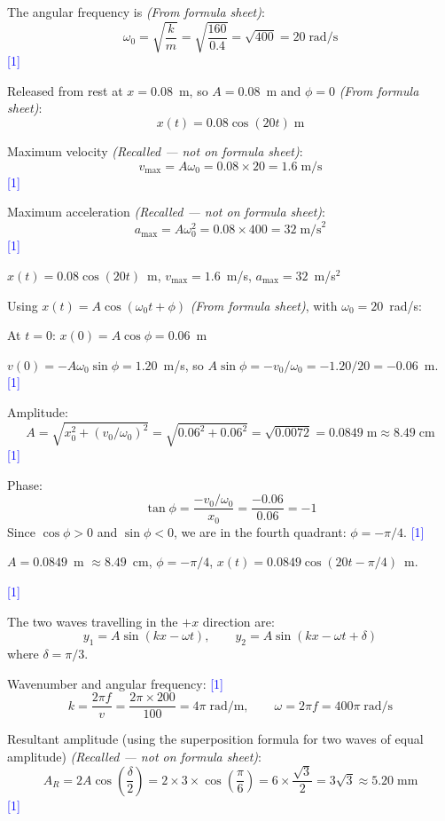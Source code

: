 \documentclass[12pt,a4paper]{article}
\newcommand{\markstep}[1]{\hfill\textcolor{blue}{[#1]}}
\newcommand{\finalanswer}[1]{%
  \begin{tcolorbox}[colback=green!5!white,colframe=green!50!black,boxrule=0.5pt]
  #1
  \end{tcolorbox}
}
\newcommand{\fromsheet}{\textit{(From formula sheet)}}
\newcommand{\recalled}{\textit{(Recalled --- not on formula sheet)}}
\begin{document}
\begin{parts}
\item The angular frequency is \fromsheet:
\[
\omega_0 = \sqrt{\frac{k}{m}} = \sqrt{\frac{160}{0.4}} = \sqrt{400} = 20\;\text{rad/s}
\]
\markstep{1}

Released from rest at $x = 0.08$~m, so $A = 0.08$~m and $\phi = 0$ \fromsheet:
\[
x(t) = 0.08\cos(20t)\;\text{m}
\]

Maximum velocity \recalled:
\[
v_\mathrm{max} = A\omega_0 = 0.08 \times 20 = 1.6\;\text{m/s}
\]
\markstep{1}

Maximum acceleration \recalled:
\[
a_\mathrm{max} = A\omega_0^2 = 0.08 \times 400 = 32\;\text{m/s}^2
\]
\markstep{1}

\finalanswer{$x(t) = 0.08\cos(20t)$~m, \quad $v_\mathrm{max} = 1.6$~m/s, \quad $a_\mathrm{max} = 32$~m/s$^2$}

\item Using $x(t) = A\cos(\omega_0 t + \phi)$ \fromsheet, with $\omega_0 = 20$~rad/s:

At $t = 0$: $x(0) = A\cos\phi = 0.06$~m

$v(0) = -A\omega_0\sin\phi = 1.20$~m/s, so $A\sin\phi = -v_0/\omega_0 = -1.20/20 = -0.06$~m. \markstep{1}

Amplitude:
\[
A = \sqrt{x_0^2 + (v_0/\omega_0)^2} = \sqrt{0.06^2 + 0.06^2} = \sqrt{0.0072} = 0.0849\;\text{m} \approx 8.49\;\text{cm}
\]
\markstep{1}

Phase:
\[
\tan\phi = \frac{-v_0/\omega_0}{x_0} = \frac{-0.06}{0.06} = -1
\]
Since $\cos\phi > 0$ and $\sin\phi < 0$, we are in the fourth quadrant: $\phi = -\pi/4$. \markstep{1}

\finalanswer{$A = 0.0849$~m $\approx 8.49$~cm, \quad $\phi = -\pi/4$, \quad $x(t) = 0.0849\cos(20t - \pi/4)$~m.}
\markstep{1}

\item The two waves travelling in the $+x$ direction are:
\[
y_1 = A\sin(kx - \omega t), \qquad y_2 = A\sin(kx - \omega t + \delta)
\]
where $\delta = \pi/3$.

Wavenumber and angular frequency: \markstep{1}
\[
k = \frac{2\pi f}{v} = \frac{2\pi \times 200}{100} = 4\pi\;\text{rad/m}, \qquad \omega = 2\pi f = 400\pi\;\text{rad/s}
\]

Resultant amplitude (using the superposition formula for two waves of equal amplitude) \recalled:
\[
A_R = 2A\cos\!\left(\frac{\delta}{2}\right) = 2 \times 3 \times \cos\!\left(\frac{\pi}{6}\right) = 6 \times \frac{\sqrt{3}}{2} = 3\sqrt{3} \approx 5.20\;\text{mm}
\]
\markstep{1}


\end{parts}
\end{document}
